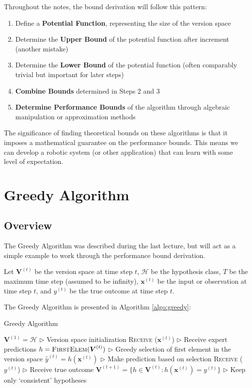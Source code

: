 \documentclass[11pt]{article}
\begin{document}
Throughout the notes, the bound derivation will follow this pattern:
\begin{enumerate}
    \item Define a \textbf{Potential Function}, representing the size of the version space
    \item Determine the \textbf{Upper Bound} of the potential function after increment (another mistake)
    \item Determine the \textbf{Lower Bound} of the potential function (often comparably trivial but important for later steps) 
    \item \textbf{Combine Bounds} determined in Steps 2 and 3
    \item \textbf{Determine Performance Bounds} of the algorithm through algebraic manipulation or approximation methods 
\end{enumerate}

The significance of finding theoretical bounds on these algorithms is that it imposes a mathematical guarantee on the performance bounds. This means we can develop a robotic system (or other application) that can learn with some level of expectation. 


\section{Greedy Algorithm}\label{section:greedy}

\subsection{Overview}

The Greedy Algorithm was described during the last lecture, but will act as a simple example to work through the performance bound derivation. 

Let $\boldsymbol{V}^{(t)}$ be the version space at time step $t$, $\mathcal{H}$ be the hypothesis class, $T$ be the maximum time step (assumed to be infinity), $\boldsymbol{x}^{(t)}$ be the input or observation at time step $t$, and $y^{(t)}$ be the true outcome at time step $t$.

The Greedy Algorithm is presented in Algorithm \ref{algo:greedy}:

\begin{algorithm}[H]
\caption{Greedy Algorithm}
\label{algo:greedy}
\begin{algorithmic}[1]
\STATE $\boldsymbol{V}^{(1)} = \mathcal{H}$  \hfill $\triangleright$ Version space initialization
\STATE \textsc{Receive} ($\boldsymbol{x}^{(t)}$) \hfill $\triangleright$ Receive expert predictions
\STATE $h = \textsc{FirstElem} (\boldsymbol{V}^{(t)})$ \hfill $\triangleright$ Greedy selection of first element in the version space
\STATE $\hat{y}^{(t)} = h(\boldsymbol{x}^{(t)})$ \hfill $\triangleright$ Make prediction based on selection
\STATE \textsc{Receive} ($y^{(t)}$) \hfill $\triangleright$ Receive true outcome
\STATE $\boldsymbol{V}^{(t+1)} = \big\{ h \in \boldsymbol{V}^{(t)} : h(\boldsymbol{x}^{(t)}) = y^{(t)} \big\} $ \hfill $\triangleright$ Keep only `consistent' hypotheses
\ENDFOR
\end{algorithmic}
\end{algorithm}
\end{document}
